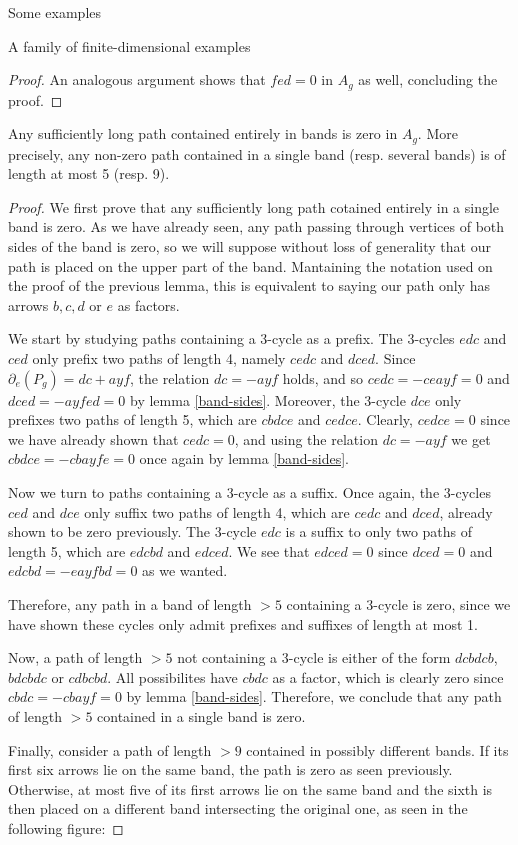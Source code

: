 \begin{chapter}{Some examples}
\begin{section}{A family of finite-dimensional examples}
\begin{proof}
An analogous argument shows that $fed=0$ in $A_g$ as well, concluding the proof. 
\end{proof}

\begin{lemma}\label{long-band-paths} Any sufficiently long path contained entirely in bands is zero in $A_g$. More precisely, any non-zero path contained in a single band (resp. several bands) is of length at most 5 (resp. 9).
\end{lemma}
\begin{proof} We first prove that any sufficiently long path cotained entirely in a single band is zero. As we have already seen, any path passing through vertices of both sides of the band is zero, so we will suppose without loss of generality that our path is placed on the upper part of the band. Mantaining the notation used on the proof of the previous lemma, this is equivalent to saying our path only has arrows $b, c, d$ or $e$ as factors.

We start by studying paths containing a $3$-cycle as a prefix. The $3$-cycles $edc$ and $ced$ only prefix two paths of length 4, namely $cedc$ and $dced$. Since $\partial_e(P_g) = dc + ayf$, the relation $dc = -ayf$ holds, and so $cedc=-ceayf=0$ and $dced=-ayfed=0$ by lemma \ref{band-sides}. Moreover, the $3$-cycle $dce$ only prefixes two paths of length 5, which are $cbdce$ and $cedce$. Clearly, $cedce=0$ since we have already shown that $cedc=0$, and using the relation $dc=-ayf$ we get $cbdce = - cbayfe=0$ once again by lemma \ref{band-sides}.

Now we turn to paths containing a $3$-cycle as a suffix. Once again, the $3$-cycles $ced$ and $dce$ only suffix two paths of length 4, which are $cedc$ and $dced$, already shown to be zero previously. The $3$-cycle $edc$ is a suffix to only two paths of length 5, which are $edcbd$ and $edced$. We see that $edced=0$ since $dced=0$ and $edcbd=-eayfbd=0$ as we wanted.

Therefore, any path in a band of length $>5$ containing a 3-cycle is zero, since we have shown these cycles only admit prefixes and suffixes of length at most 1.

Now, a path of length $>5$ not containing a 3-cycle is either of the form $dcbdcb$, $bdcbdc$ or $cdbcbd$. All possibilites have $cbdc$ as a factor, which is clearly zero since $cbdc = -cbayf = 0$ by lemma \ref{band-sides}. Therefore, we conclude that any path of length $>5$ contained in a single band is zero.

Finally, consider a path of length $>9$ contained in possibly different bands. If its first six arrows lie on the same band, the path is zero as seen previously. Otherwise, at most five of its first arrows lie on the same band and the sixth is then placed on a different band intersecting the original one, as seen in the following figure:


\end{proof}
\end{section}
\end{chapter}
